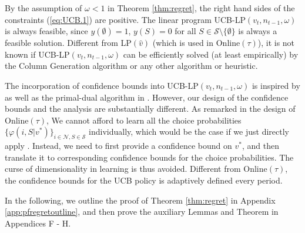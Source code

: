 \documentclass{article}
\theoremstyle{definition}
\newcommand{\NNN}{\mathcal{N}}
\newcommand{\SSS}{\mathcal{S}}
\begin{document}
By the assumption of $\omega < 1$ in Theorem \ref{thm:regret}, the right hand sides of the constraints (\ref{eq:UCB.1}) are positive. The linear program UCB-LP$(v_t, n_{t-1}, \omega)$ is always feasible, since $y(\emptyset) = 1$, $y(S) = 0$ for all $S\in\SSS\setminus \{\emptyset\}$ is always a feasible solution. Different from LP$(\hat{v})$ (which is used in {\sc Online}$(\tau)$), it is not known if UCB-LP$(v_t, n_{t-1}, \omega)$ can be efficiently solved (at least empirically) by the Column Generation algorithm or any other algorithm or heuristic.

The incorporation of confidence bounds into UCB-LP$(v_t, n_{t-1}, \omega)$ is inspired by \cite{AgrawalD14} as well as the primal-dual algorithm in \cite{BadanidiyuruKS13}. However, our design of the confidence bounds and the analysis are substantially different. As remarked in the design of {\sc Online}$(\tau)$, We cannot afford to learn all the choice probabilities $\{\varphi(i, S|v^*)\}_{i\in \NNN, S\in \SSS}$ individually, which would be the case if we just directly apply \cite{AgrawalD14}\cite{BadanidiyuruKS13}. Instead, we need to first provide a confidence bound on $v^*$, and then translate it to corresponding confidence bounds for the choice probabilities. The curse of dimensionality in learning is thus avoided. Different from {\sc Online}$(\tau)$, the confidence bounds for the UCB policy is adaptively defined every period. 


In the following, we outline the proof of Theorem \ref{thm:regret} in Appendix \ref{app:pfregretoutline}, and then prove the auxiliary Lemmas and Theorem in Appendices F - H.
\end{document}
